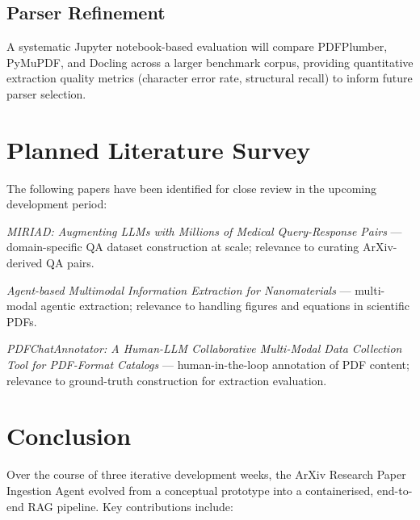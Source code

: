 \documentclass[12pt, a4paper]{article}
\begin{document}
\subsection{Parser Refinement}

A systematic Jupyter notebook-based evaluation will compare PDFPlumber,
PyMuPDF, and Docling across a larger benchmark corpus, providing
quantitative extraction quality metrics (character error rate, structural
recall) to inform future parser selection.

\section{Planned Literature Survey}
\label{sec:lit}

The following papers have been identified for close review in the
upcoming development period:

\begin{enumerate}[leftmargin=*, label={[\arabic*]}]
    \item \textit{MIRIAD: Augmenting LLMs with Millions of Medical
          Query-Response Pairs} \cite{miriad2025} --- domain-specific
          QA dataset construction at scale; relevance to curating
          ArXiv-derived QA pairs.
    \item \textit{Agent-based Multimodal Information Extraction for
          Nanomaterials} \cite{agentnano2025} --- multi-modal agentic
          extraction; relevance to handling figures and equations in
          scientific PDFs.
    \item \textit{PDFChatAnnotator: A Human-LLM Collaborative
          Multi-Modal Data Collection Tool for PDF-Format Catalogs}
          \cite{pdfchat2024} --- human-in-the-loop annotation of
          PDF content; relevance to ground-truth construction for
          extraction evaluation.
\end{enumerate}

\section{Conclusion}
\label{sec:conclusion}

Over the course of three iterative development weeks, the ArXiv Research
Paper Ingestion Agent evolved from a conceptual prototype into a
containerised, end-to-end RAG pipeline. Key contributions include:
\end{document}

